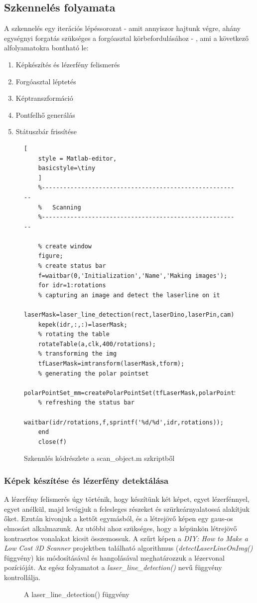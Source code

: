 \documentclass[12pt,a4paper]{article}
\begin{document}
\subsection{Szkennelés folyamata}
A szkennelés egy iterációs lépéssorozat - amit annyiszor hajtunk végre, ahány egységnyi forgatás szükséges a forgóasztal körbefordulásához - , ami a következő alfolyamatokra bontható le:
\begin{enumerate}
	\item Képkészítés és lézerfény felismerés
	\item Forgóasztal léptetés
	\item Képtranszformáció
	\item Pontfelhő generálás
	\item Státuszbár frissítése
\end{enumerate} 
\begin{figure}[h!]
	\centering
	\begin{lstlisting}[
	style = Matlab-editor,
	basicstyle=\tiny
	]
	%--------------------------------------------------------
	%   Scanning
	%--------------------------------------------------------
	
	% create window
	figure;
	% create status bar
	f=waitbar(0,'Initialization','Name','Making images');
	for idr=1:rotations
	% capturing an image and detect the laserline on it
	laserMask=laser_line_detection(rect,laserDino,laserPin,cam);
	kepek(idr,:,:)=laserMask;
	% rotating the table
	rotateTable(a,clk,400/rotations);
	% transforming the img
	tfLaserMask=imtransform(laserMask,tform);
	% generating the polar pointset
	polarPointSet_mm=createPolarPointSet(tfLaserMask,polarPointSet_mm,idr,xdata,ydata);
	% refreshing the status bar
	waitbar(idr/rotations,f,sprintf('%d/%d',idr,rotations));
	end
	close(f)
	\end{lstlisting}
	\caption{Szkennlés kódrészlete a scan\_object.m szkriptből}
\end{figure}

\subsubsection{Képek készítése és lézerfény detektálása}
A lézerfény felismerés úgy történik, hogy készítünk két képet, egyet lézerfénnyel, egyet anélkül, majd levágjuk a felesleges részeket és szürkeárnyalatossá alakítjuk őket. Ezután kivonjuk a kettőt egymásból, és a létrejövő képen egy gaus-os elmosást alkalmazunk. Az utóbbi ahoz szükséges, hogy a képünkön létrejövő kontrasztos vonalakat kicsit összemossuk. A szűrt képen a \textit{DIY: How to Make a Low Cost 3D Scanner} projektben található algorithmus (\textit{detectLaserLineOnImg()} függvény) kis módosításával és hangolásával meghatározzuk a lézervonal pozícióját. Az egész folyamatot a \textit{laser\_line\_detection()} nevű függvény kontrollálja.
\begin{figure}[h!]
	\centering
	
	\caption{A laser\_line\_detection() függvény}
\end{figure}
\end{document}
